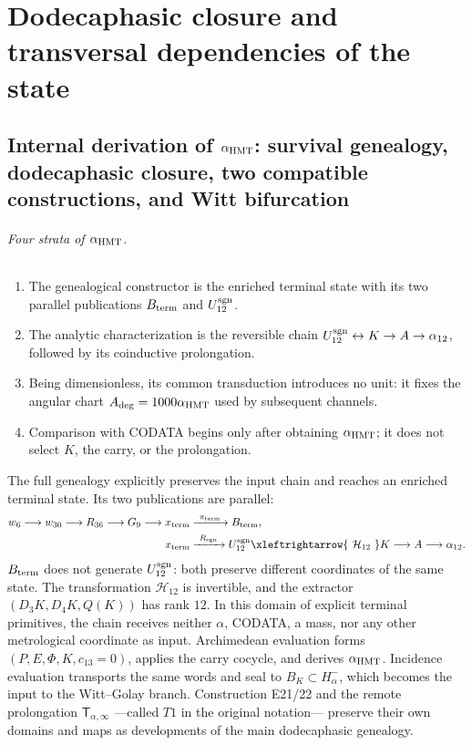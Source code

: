 \part{Dodecaphasic closure and transversal dependencies of the state}

\chapter[Internal derivation of the fine-structure constant]{Internal derivation of \texorpdfstring{\(\alpha_{\rm HMT}\)}{alpha HMT}: survival genealogy, dodecaphasic closure, two compatible constructions, and Witt bifurcation}
\label{chap:alpha-rev7}

\paragraph{Four strata of \(\alpha_{\rm HMT}\).}
\begin{enumerate}
 \item The genealogical constructor is the enriched terminal state with its two parallel publications \(B_{\rm term}\) and \(U_{12}^{\rm sgn}\).
 \item The analytic characterization is the reversible chain \(U_{12}^{\rm sgn}\leftrightarrow K\to A\to\alpha_{12}\), followed by its coinductive prolongation.
 \item Being dimensionless, its common transduction introduces no unit: it fixes the angular chart \(A_{\rm deg}=1000\alpha_{\rm HMT}\) used by subsequent channels.
 \item Comparison with CODATA begins only after obtaining \(\alpha_{\rm HMT}\); it does not select \(K\), the carry, or the prolongation.
\end{enumerate}
The full genealogy explicitly preserves the input chain and reaches an enriched terminal state. Its two publications are parallel:
\[
\begin{aligned}
 w_6\longrightarrow w_{30}\longrightarrow R_{36}\longrightarrow G_9
 \longrightarrow x_{\rm term}
 &\xrightarrow{\ \pi_{\rm term}\ }B_{\rm term},\\
 x_{\rm term}
 &\xrightarrow{\ R_{\rm sgn}\ }U_{12}^{\rm sgn}
 \xleftrightarrow{\ \mathcal H_{12}\ }K
 \longrightarrow A\longrightarrow\alpha_{12}.
\end{aligned}
\]
\(B_{\rm term}\) does not generate \(U_{12}^{\rm sgn}\): both preserve different coordinates of the same state. The transformation \(\mathcal H_{12}\) is invertible, and the extractor \((D_3K,D_4K,Q(K))\) has rank \(12\). In this domain of explicit terminal primitives, the chain receives neither \(\alpha\), CODATA, a mass, nor any other metrological coordinate as input. Archimedean evaluation forms \((P,E,\Phi,K,c_{13}=0)\), applies the carry cocycle, and derives \(\alpha_{\rm HMT}\). Incidence evaluation transports the same words and seal to \(B_K\subset H_\alpha^-\), which becomes the input to the Witt--Golay branch. Construction E21/22 and the remote prolongation \(\mathsf T_{\alpha,\infty}\) ---called \(T1\) in the original notation--- preserve their own domains and maps as developments of the main dodecaphasic genealogy.

